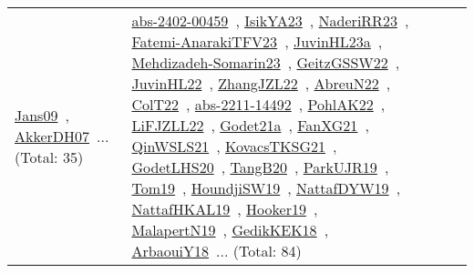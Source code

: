{\begin{longtable}{lp{3cm}>{\raggedright\arraybackslash}p{6cm}>{\raggedright\arraybackslash}p{6cm}>{\raggedright\arraybackslash}p{8cm}}
\href{../works/Jans09.pdf}{Jans09}~\cite{Jans09}, \href{../works/AkkerDH07.pdf}{AkkerDH07}~\cite{AkkerDH07}... (Total: 35) & \href{../works/abs-2402-00459.pdf}{abs-2402-00459}~\cite{abs-2402-00459}, \href{../works/IsikYA23.pdf}{IsikYA23}~\cite{IsikYA23}, \href{../works/NaderiRR23.pdf}{NaderiRR23}~\cite{NaderiRR23}, \href{../works/Fatemi-AnarakiTFV23.pdf}{Fatemi-AnarakiTFV23}~\cite{Fatemi-AnarakiTFV23}, \href{../works/JuvinHL23a.pdf}{JuvinHL23a}~\cite{JuvinHL23a}, \href{../works/Mehdizadeh-Somarin23.pdf}{Mehdizadeh-Somarin23}~\cite{Mehdizadeh-Somarin23}, \href{../works/GeitzGSSW22.pdf}{GeitzGSSW22}~\cite{GeitzGSSW22}, \href{../works/JuvinHL22.pdf}{JuvinHL22}~\cite{JuvinHL22}, \href{../works/ZhangJZL22.pdf}{ZhangJZL22}~\cite{ZhangJZL22}, \href{../works/AbreuN22.pdf}{AbreuN22}~\cite{AbreuN22}, \href{../works/ColT22.pdf}{ColT22}~\cite{ColT22}, \href{../works/abs-2211-14492.pdf}{abs-2211-14492}~\cite{abs-2211-14492}, \href{../works/PohlAK22.pdf}{PohlAK22}~\cite{PohlAK22}, \href{../works/LiFJZLL22.pdf}{LiFJZLL22}~\cite{LiFJZLL22}, \href{../works/Godet21a.pdf}{Godet21a}~\cite{Godet21a}, \href{../works/FanXG21.pdf}{FanXG21}~\cite{FanXG21}, \href{../works/QinWSLS21.pdf}{QinWSLS21}~\cite{QinWSLS21}, \href{../works/KovacsTKSG21.pdf}{KovacsTKSG21}~\cite{KovacsTKSG21}, \href{../works/GodetLHS20.pdf}{GodetLHS20}~\cite{GodetLHS20}, \href{../works/TangB20.pdf}{TangB20}~\cite{TangB20}, \href{../works/ParkUJR19.pdf}{ParkUJR19}~\cite{ParkUJR19}, \href{../works/Tom19.pdf}{Tom19}~\cite{Tom19}, \href{../works/HoundjiSW19.pdf}{HoundjiSW19}~\cite{HoundjiSW19}, \href{../works/NattafDYW19.pdf}{NattafDYW19}~\cite{NattafDYW19}, \href{../works/NattafHKAL19.pdf}{NattafHKAL19}~\cite{NattafHKAL19}, \href{../works/Hooker19.pdf}{Hooker19}~\cite{Hooker19}, \href{../works/MalapertN19.pdf}{MalapertN19}~\cite{MalapertN19}, \href{../works/GedikKEK18.pdf}{GedikKEK18}~\cite{GedikKEK18}, \href{../works/ArbaouiY18.pdf}{ArbaouiY18}~\cite{ArbaouiY18}... (Total: 84)\\
\end{longtable}
}

